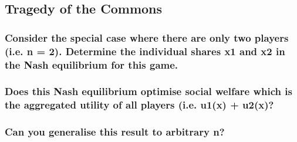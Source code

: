 
\subsection{Tragedy of the Commons}

\subsubsection{Consider the special case where there are only two players (i.e. n = 2). Determine the individual shares x1 and x2 in the Nash equilibrium for this game.}

\subsubsection{Does this Nash equilibrium optimise social welfare which is the aggregated utility of all players (i.e. u1(x) + u2(x)?}

\subsubsection{Can you generalise this result to arbitrary n?}